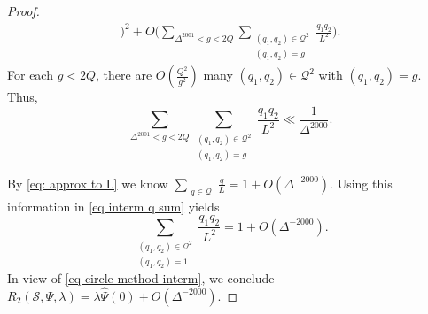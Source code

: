 \documentclass[12pt,reqno]{amsart}
\theoremstyle{plain}
\numberwithin{equation}{section}
\numberwithin{figure}{section}
\theoremstyle{plain}
\theoremstyle{definition}
\theoremstyle{remark}
\begin{document}
\begin{proof}
\begin{align}
\Bigg)^2
+ O\Bigg( 
\sum_{\Delta^{2001}< g < 2Q}
\sum_{\substack{(q_1,q_2)\in \mathcal{Q}^2\\
(q_1,q_2)=g}} \frac{q_1q_2}{L^2}
\Bigg).
\end{align}
For each $g<2Q$, there are 
$O(\frac{Q^2}{g^2})$
many $(q_1,q_2)\in \mathcal{Q}^2$ 
with $(q_1,q_2)=g$. Thus, 
$$
\sum_{\Delta^{2001}< g < 2Q}
\sum_{\substack{(q_1,q_2)\in \mathcal{Q}^2\\
(q_1,q_2)=g}} \frac{q_1q_2}{L^2}
\ll 
\frac{1}{\Delta^{2000}}.
$$

By \eqref{eq: approx to L} we know
$\sum_{\substack{q\in \mathcal{Q}}} \frac{q}{L}
= 1 + O(\Delta^{-2000})$.
Using this information in \eqref{eq interm q sum} 
yields
$$
\sum_{\substack{(q_1,q_2)\in \mathcal{Q}^2\\
(q_1,q_2)=1}} \frac{q_1q_2}{L^2}
= 
1
+ O(\Delta^{-2000}).
$$
In view of \eqref{eq circle method interm}, we conclude 
$R_2(\mathcal{S},\Psi,\lambda)= 
\lambda \widehat{\Psi}(0) + O(\Delta^{-2000})$.
\end{proof}
\end{document}
